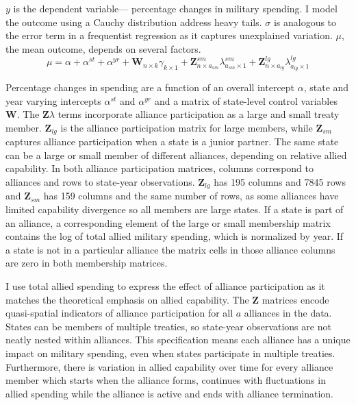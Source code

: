 \documentclass[12pt]{article}
\begin{document}
$y$ is the dependent variable--- percentage changes in military spending. 
I model the outcome using a Cauchy distribution address heavy tails.
$\sigma$ is analogous to the error term in a frequentist regression as it captures unexplained variation.  
$\mu$, the mean outcome, depends on several factors.
\begin{equation}
\mu = \alpha + \alpha^{st} + \alpha^{yr} +\textbf{W}_{n \times k} \gamma_{k \times 1} + \textbf{Z}^{sm}_{n \times a_{sm}} \lambda^{sm}_{a_{sm} \times 1} + \textbf{Z}^{lg}_{n \times a_{lg}} \lambda^{lg}_{a_{lg} \times 1} 
\end{equation}


Percentage changes in spending are a function of an overall intercept $\alpha$, state and year varying intercepts $\alpha^{st}$ and $\alpha^{yr}$ and a matrix of state-level control variables $\textbf{W}$.
The $\textbf{Z} \lambda$ terms incorporate alliance participation as a large and small treaty member. 
$\textbf{Z}_{lg}$ is the alliance participation matrix for large members, while $\textbf{Z}_{sm}$ captures alliance participation when a state is a junior partner. 
The same state can be a large or small member of different alliances, depending on relative allied capability. 
In both alliance participation matrices, columns correspond to alliances and rows to state-year observations. 
$\textbf{Z}_{lg}$ has 195 columns and 7845 rows and $\textbf{Z}_{sm}$ has 159 columns and the same number of rows, as some alliances have limited capability divergence so all members are large states. 
If a state is part of an alliance, a corresponding element of the large or small membership matrix contains the log of total allied military spending, which is normalized by year.
If a state is not in a particular alliance the matrix cells in those alliance columns are zero in both membership matrices.


I use total allied spending to express the effect of alliance participation as it matches the theoretical emphasis on allied capability. 
The $\textbf{Z}$ matrices encode quasi-spatial indicators of alliance participation for all $a$ alliances in the data. 
States can be members of multiple treaties, so state-year observations are not neatly nested within alliances. 
This specification means each alliance has a unique impact on military spending, even when states participate in multiple treaties. 
Furthermore, there is variation in allied capability over time for every alliance member which starts when the alliance forms, continues with fluctuations in allied spending while the alliance is active and ends with alliance termination. 
\end{document}
